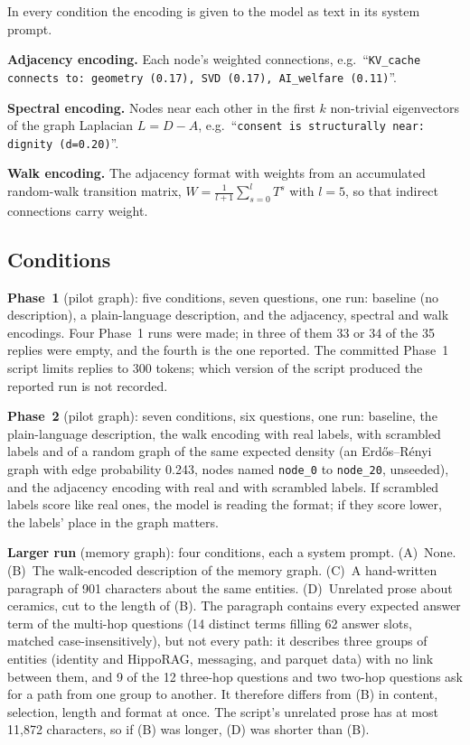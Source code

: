 \documentclass[11pt,a4paper]{article}
\begin{document}
In every condition the encoding is given to the model as text in its system prompt.

\textbf{Adjacency encoding.} Each node's weighted connections, e.g.\ ``\texttt{KV\_cache connects to: geometry (0.17), SVD (0.17), AI\_welfare (0.11)}''.

\textbf{Spectral encoding.} Nodes near each other in the first $k$ non-trivial eigenvectors of the graph Laplacian $L = D - A$, e.g.\ ``\texttt{consent is structurally near: dignity (d=0.20)}''.

\textbf{Walk encoding.} The adjacency format with weights from an accumulated random-walk transition matrix, $W = \frac{1}{l+1}\sum_{s=0}^{l} T^s$ with $l=5$, so that indirect connections carry weight.

\subsection{Conditions}

\textbf{Phase~1} (pilot graph): five conditions, seven questions, one run: baseline (no description), a plain-language description, and the adjacency, spectral and walk encodings. Four Phase~1 runs were made; in three of them 33 or 34 of the 35 replies were empty, and the fourth is the one reported. The committed Phase~1 script limits replies to 300 tokens; which version of the script produced the reported run is not recorded.

\textbf{Phase~2} (pilot graph): seven conditions, six questions, one run: baseline, the plain-language description, the walk encoding with real labels, with scrambled labels and of a random graph of the same expected density (an Erd\H{o}s--R\'enyi graph with edge probability 0.243, nodes named \texttt{node\_0} to \texttt{node\_20}, unseeded), and the adjacency encoding with real and with scrambled labels. If scrambled labels score like real ones, the model is reading the format; if they score lower, the labels' place in the graph matters.

\textbf{Larger run} (memory graph): four conditions, each a system prompt. (A)~None. (B)~The walk-encoded description of the memory graph. (C)~A hand-written paragraph of 901 characters about the same entities. (D)~Unrelated prose about ceramics, cut to the length of (B). The paragraph contains every expected answer term of the multi-hop questions (14 distinct terms filling 62 answer slots, matched case-insensitively), but not every path: it describes three groups of entities (identity and HippoRAG, messaging, and parquet data) with no link between them, and 9 of the 12 three-hop questions and two two-hop questions ask for a path from one group to another. It therefore differs from (B) in content, selection, length and format at once. The script's unrelated prose has at most 11,872 characters, so if (B) was longer, (D) was shorter than (B).
\end{document}
